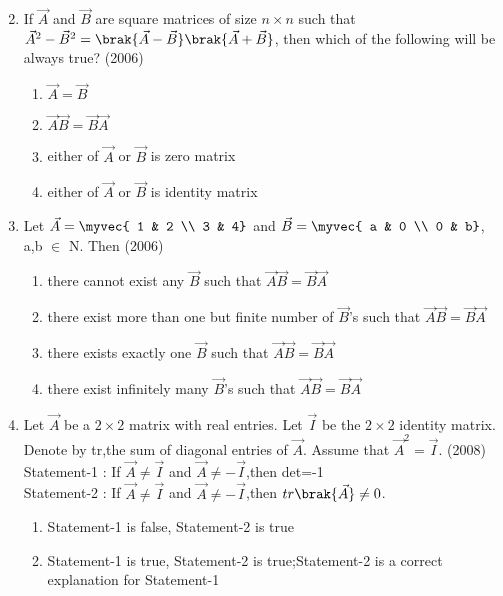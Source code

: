 \begin{enumerate}
\begin{multicols}{4}
\begin{enumerate}
		\end{enumerate}
\end{multicols}
	\item If $\vec{A}$ and $\vec{B}$ are square matrices of size $n \times n$ such that $\vec{A}^2-\vec{B}^2=\brak{\vec{A}-\vec{B}}\brak{\vec{A}+\vec{B}}$, then which of the following will be always true? \hfill{(2006)}
\begin{multicols}{2}
		\begin{enumerate}
			\item $\vec{A}=\vec{B}$
			\item $\vec{A}\vec{B}=\vec{B}\vec{A}$
			\item either of $\vec{A}$ or $\vec{B}$ is zero matrix
			\item either of $\vec{A}$ or $\vec{B}$ is identity matrix
		\end{enumerate}
\end{multicols}
	\item Let $\vec{A}=\myvec{
			1 & 2 \\
			3 & 4}$ and $\vec{B}=\myvec{
			a & 0 \\
			0 & b}$, a,b $\in$ N. Then \hfill{(2006)}
		\begin{enumerate}
			\item there cannot exist any $\vec{B}$ such that $\vec{A}\vec{B}=\vec{B}\vec{A}$
			\item there exist more than one but finite number of $\vec{B}$'s such that $\vec{A}\vec{B}=\vec{B}\vec{A}$
			\item there exists exactly one $\vec{B}$ such that $\vec{A}\vec{B}=\vec{B}\vec{A}$
			\item there exist infinitely many $\vec{B}$'s such that $\vec{A}\vec{B}=\vec{B}\vec{A}$
		\end{enumerate}
	\item Let $\vec{A}$ be a $2 \times 2$ matrix with real entries. Let $\vec{I}$ be the $2 \times 2$ identity matrix. Denote by tr,the sum of diagonal entries of $\vec{A}$. Assume that $\vec{A}^2 = \vec{I}$. \hfill{(2008)} \\
		Statement-1 : If $\vec{A} \neq \vec{I}$ and $\vec{A} \neq -\vec{I}$,then det=-1 \\
		Statement-2 : If $\vec{A} \neq \vec{I}$ and $\vec{A} \neq -\vec{I}$,then $tr\brak{\vec{A}} \neq 0$.
		\begin{enumerate}
			\item Statement-1 is false, Statement-2 is true
			\item Statement-1 is true, Statement-2 is true;Statement-2 is a correct explanation for Statement-1

\end{enumerate}
\end{enumerate}
